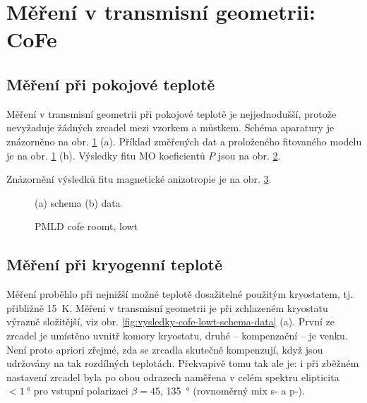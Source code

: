 \section{Měření v transmisní geometrii: CoFe}
\label{chap:vysledky-cofe}

\subsection{Měření při pokojové teplotě}
\label{chap:vysledky-cofe-roomt}

Měření v transmisní geometrii při pokojové teplotě je nejjednodušší, protože nevyžaduje žádných zrcadel mezi vzorkem a můstkem.
Schéma aparatury je znázorněno na obr. \ref{fig:vysledky-cofe-schema-data} (a).
Příklad změřených dat a proloženého fitovaného modelu je na obr. \ref{fig:vysledky-cofe-schema-data} (b).
Výsledky fitu MO koeficientů $P$ jsou na obr. \ref{fig:vysledky-cofe-PMLD}.

Znázornění výsledků fitu magnetické anizotropie je na obr. \ref{fig:vysledky-cofe-roomt-anizotropie}.

\begin{figure}[htbp]
    \centering
    \missingfigure{}
    \caption{(a) schema (b) data}
    \label{fig:vysledky-cofe-schema-data}
\end{figure}

\begin{figure}[htbp]
    \centering
    \missingfigure{}
    \caption{PMLD cofe roomt, lowt}
    \label{fig:vysledky-cofe-PMLD}
\end{figure}

\begin{figure}[htbp]
    \centering
    \missingfigure{}
    \caption{}
    \label{fig:vysledky-cofe-roomt-anizotropie}
\end{figure}

\subsection{Měření při kryogenní teplotě}
\label{chap:vysledky-cofe-lowt}

Měření proběhlo při nejnižší možné teplotě dosažitelné použitým kryostatem, tj. přibližně \SI{15}{\kelvin}.
Měření v transmisní geometrii je při zchlazeném kryostatu výrazně složitější, viz obr. \ref{fig:vysledky-cofe-lowt-schema-data} (a).
První ze zrcadel je umístěno uvnitř komory kryostatu, druhé -- kompenzační -- je venku.
Není proto apriori zřejmé, zda se zrcadla skutečně kompenzují, když jsou udržovány na tak rozdílných teplotách.
Překvapivě tomu tak ale je: i při zběžném nastavení zrcadel byla po obou odrazech naměřena v celém spektru elipticita $<\SI{1}{\degree}$ pro vstupní polarizaci $\beta=45$, \SI{135}{\degree} (rovnoměrný mix s- a p-).

